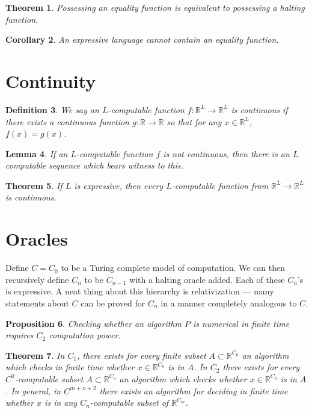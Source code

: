\documentclass[11pt]{article}
\theoremstyle{plain}
\newtheorem{prop}{Proposition}[section]
\newtheorem{thm}[prop]{Theorem}
\newtheorem{lemma}[prop]{Lemma}
\newtheorem{defn}[prop]{Definition}
\newtheorem{cly}[prop]{Corollary}
\newcommand{\bb}[1]{\mathbb{#1}}
\newcommand{\ra}{\rightarrow}
\begin{document}
\begin{thm} Possessing an equality function is equivalent to possessing a halting function.\end{thm}

\begin{cly} An expressive language cannot contain an equality function. \end{cly}

\section{Continuity}

\begin{defn} We say an $L$-computable function $f:\bb R^L\ra\bb R^L$ is continuous if there exists a continuous function $g:\bb R\ra \bb R$ so that for any $x\in\bb R^L$, $f(x) = g(x)$.\end{defn}

\begin{lemma} If an $L$-computable function $f$ is not continuous, then there is an $L$ computable sequence which bears witness to this. \end{lemma}

\begin{thm} If $L$ is expressive, then every $L$-computable function from $\bb R^L\ra \bb R^L$ is continuous. \end{thm}

\section{Oracles}
Define $C = C_0$ to be a Turing complete model of computation. We can then recursively define $C_n$ to be $C_{n-1}$ with a halting oracle added. Each of these $C_n$'s is expressive. A neat thing about this hierarchy is relativization --- many statements about $C$ can be proved for $C_n$ in a manner completely analogous to $C$.

\begin{prop} Checking whether an algorithm $P$ is numerical in finite time requires $C_2$ computation power.\end{prop}

\begin{thm} In $C_1$, there exists for every finite subset $A\subset\bb R^{C_0}$ an algorithm which checks in finite time whether $x\in\bb R^{C_0}$ is in $A$. In $C_2$ there exists for every $C^0$-computable subset $A\subset\bb R^{C_0}$ an algorithm which checks whether $x\in\bb R^{C_0}$ is in $A$. In general, in $C^{m+n+2}$ there exists an algorithm for deciding in finite time whether $x$ is in any $C_n$-computable subset of $\bb R^{C_m}$.\end{thm}
\end{document}
